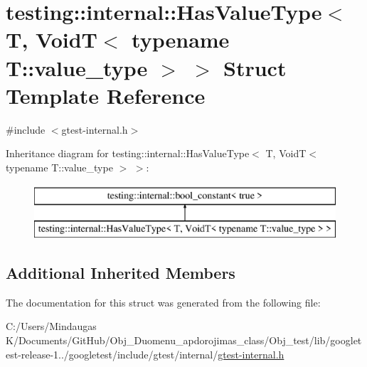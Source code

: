 \hypertarget{structtesting_1_1internal_1_1_has_value_type_3_01_t_00_01_void_t_3_01typename_01_t_1_1value__type_01_4_01_4}{}\section{testing\+::internal\+::Has\+Value\+Type$<$ T, VoidT$<$ typename T\+::value\+\_\+type $>$ $>$ Struct Template Reference}
\label{structtesting_1_1internal_1_1_has_value_type_3_01_t_00_01_void_t_3_01typename_01_t_1_1value__type_01_4_01_4}


{\ttfamily \#include $<$gtest-\/internal.\+h$>$}

Inheritance diagram for testing\+::internal\+::Has\+Value\+Type$<$ T, VoidT$<$ typename T\+::value\+\_\+type $>$ $>$\+:\begin{figure}[H]
\begin{center}
\leavevmode
\includegraphics[height=2.000000cm]{dc/dba/structtesting_1_1internal_1_1_has_value_type_3_01_t_00_01_void_t_3_01typename_01_t_1_1value__type_01_4_01_4}
\end{center}
\end{figure}
\subsection*{Additional Inherited Members}


The documentation for this struct was generated from the following file\+:\begin{DoxyCompactItemize}
\item 
C\+:/\+Users/\+Mindaugas K/\+Documents/\+Git\+Hub/\+Obj\+\_\+\+Duomenu\+\_\+apdorojimas\+\_\+class/\+Obj\+\_\+test/lib/googletest-\/release-\/1../googletest/include/gtest/internal/\mbox{\hyperlink{_obj__test_2lib_2googletest-release-1_88_81_2googletest_2include_2gtest_2internal_2gtest-internal_8h}{gtest-\/internal.\+h}}\end{DoxyCompactItemize}

